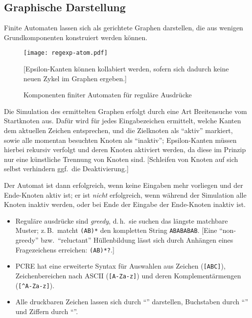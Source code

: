 \subsection{Graphische Darstellung}
Finite Automaten lassen sich als gerichtete Graphen darstellen, die aus wenigen Grundkomponenten konstruiert werden können.
\begin{figure}[htb]
\centering\texttt{[image: regexp-atom.pdf]}

{\footnotesize[Epsilon-Kanten können kollabiert werden, sofern sich dadurch keine neuen Zykel im Graphen ergeben.]}

\caption{Komponenten finiter Automaten für reguläre Ausdrücke}
\end{figure}

Die Simulation des ermittelten Graphen erfolgt durch eine Art Breitensuche vom Startknoten aus.
Dafür wird für jedes Eingabezeichen ermittelt, welche Kanten dem aktuellen Zeichen entsprechen, und die Zielknoten als \enquote{aktiv} markiert, sowie alle momentan besuchten Knoten als \enquote{inaktiv}; Epsilon-Kanten müssen hierbei rekursiv verfolgt und deren Knoten aktiviert werden, da diese im Prinzip nur eine künstliche Trennung von Knoten sind.
[Schleifen von Knoten auf sich selbst verhindern ggf.~die Deaktivierung.]

Der Automat ist dann erfolgreich, wenn keine Eingaben mehr vorliegen und der Ende-Knoten aktiv ist; er ist \emph{nicht} erfolgreich, wenn während der Simulation alle Knoten inaktiv werden, oder bei Ende der Eingabe der Ende-Knoten inaktiv ist.

\begin{itemize}
    \item Reguläre ausdrücke sind \emph{greedy}, d.\,h.~sie suchen das längste matchbare Muster; z.\,B.~matcht \texttt{(AB)*} den kompletten String \texttt{ABABABAB}.
        [Eine \enquote{non-greedy} bzw.~\enquote{reluctant} Hüllenbildung lässt sich durch Anhängen eines Fragezeichens erreichen: \texttt{(AB)*?}.]
    \item PCRE hat eine erweiterte Syntax für Auswahlen aus Zeichen (\texttt{[ABC]}), Zeichenbereichen nach ASCII (\texttt{[A-Za-z]}) und deren Komplementärmengen (\texttt{[\^{}A-Za-z]}).
    \item Alle druckbaren Zeichen lassen sich durch \enquote{} darstellen, Buchstaben durch \enquote{} und Ziffern durch \enquote{}.
\end{itemize}

